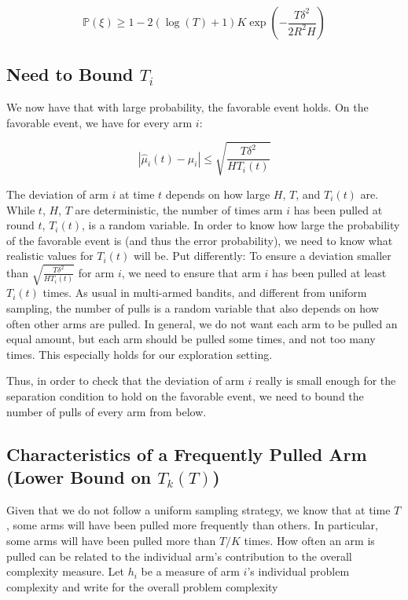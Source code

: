 \documentclass[12pt,]{article}
\begin{document}
\[
\mathbb{P}(\xi) \geq 1 - 2(\log(T) +1)K \exp(-\frac{T\delta^2}{2R^2H})
\]

\subsection{\texorpdfstring{Need to Bound
\(T_i\)}{Need to Bound T\_i}}\label{need-to-bound-t_i}

We now have that with large probability, the favorable event holds. On
the favorable event, we have for every arm \(i\):

\[
| \hat{\mu}_i(t) - \mu_i| \leq \sqrt{\frac{T\delta^2}{HT_i(t)}}
\]

The deviation of arm \(i\) at time \(t\) depends on how large \(H\),
\(T\), and \(T_i(t)\) are. While \(t\), \(H\), \(T\) are deterministic,
the number of times arm \(i\) has been pulled at round \(t\),
\(T_i(t)\), is a random variable. In order to know how large the
probability of the favorable event is (and thus the error probability),
we need to know what realistic values for \(T_i(t)\) will be. Put
differently: To ensure a deviation smaller than
\(\sqrt{\frac{T\delta^2}{HT_i(t)}}\) for arm \(i\), we need to ensure
that arm \(i\) has been pulled at least \(T_i(t)\) times. As usual in
multi-armed bandits, and different from uniform sampling, the number of
pulls is a random variable that also depends on how often other arms are
pulled. In general, we do not want each arm to be pulled an equal
amount, but each arm should be pulled some times, and not too many
times. This especially holds for our exploration setting.

Thus, in order to check that the deviation of arm \(i\) really is small
enough for the separation condition to hold on the favorable event, we
need to bound the number of pulls of every arm from below.

\subsection{\texorpdfstring{Characteristics of a Frequently Pulled Arm
(Lower Bound on
\(T_k(T)\))}{Characteristics of a Frequently Pulled Arm (Lower Bound on T\_k(T))}}\label{characteristics-of-a-frequently-pulled-arm-lower-bound-on-t_kt}

Given that we do not follow a uniform sampling strategy, we know that at
time \(T\), some arms will have been pulled more frequently than others.
In particular, some arms will have been pulled more than \(T/K\) times.
How often an arm is pulled can be related to the individual arm's
contribution to the overall complexity measure. Let \(h_i\) be a measure
of arm \(i\)'s individual problem complexity and write for the overall
problem complexity
\end{document}

